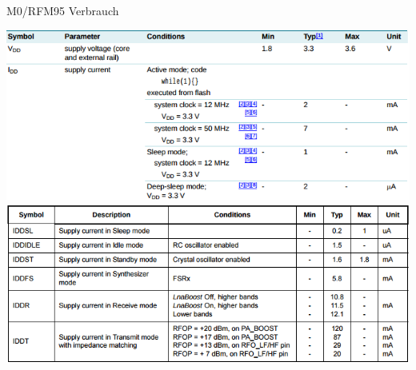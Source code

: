 \documentclass[18pt]{beamer}
\begin{document}
\begin{frame}{M0/RFM95 Verbrauch}%
	\begin{minipage}[t][\textheight][t]{\textwidth}
		\centering
		\includegraphics[height=0.4\textheight]{images/m0power.png}
		\includegraphics[height=0.4\textheight]{images/lorapower.png}
	\end{minipage}
\end{frame}

\backupend
\end{document}
